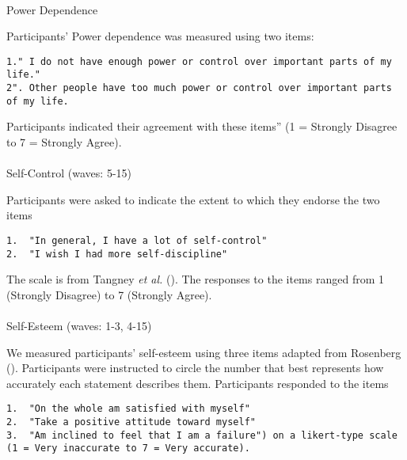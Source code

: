 \documentclass[
  singlecolumn,
  9pt]{scrartcl}
\makeatletter
\let\oldparagraph\paragraph
\renewcommand{\paragraph}{
    \@ifstar
      \xxxParagraphStar
      \xxxParagraphNoStar
  }
\newcommand{\xxxParagraphStar}[1]{\oldparagraph*{#1}\mbox{}}
\newcommand{\xxxParagraphNoStar}[1]{\oldparagraph{#1}\mbox{}}
\makeatother
\begin{document}
\paragraph{Power Dependence}\label{power-dependence}

Participants' Power dependence was measured using two items:

\begin{verbatim}
1." I do not have enough power or control over important parts of my life."
2". Other people have too much power or control over important parts of my life. 
\end{verbatim}

Participants indicated their agreement with these items'' (1 = Strongly
Disagree to 7 = Strongly Agree).

\paragraph{Self-Control (waves: 5-15)}\label{self-control-waves-5-15}

Participants were asked to indicate the extent to which they endorse the
two items

\begin{verbatim}
1.  "In general, I have a lot of self-control"
2.  "I wish I had more self-discipline"
\end{verbatim}

The scale is from Tangney \emph{et al.}
(). The responses to the items
ranged from 1 (Strongly Disagree) to 7 (Strongly Agree).

\paragraph{Self-Esteem (waves: 1-3,
4-15)}\label{self-esteem-waves-1-3-4-15}

We measured participants' self-esteem using three items adapted from
Rosenberg (). Participants were
instructed to circle the number that best represents how accurately each
statement describes them. Participants responded to the items

\begin{verbatim}
1.  "On the whole am satisfied with myself"
2.  "Take a positive attitude toward myself"
3.  "Am inclined to feel that I am a failure") on a likert-type scale (1 = Very inaccurate to 7 = Very accurate).
\end{verbatim}
\end{document}
